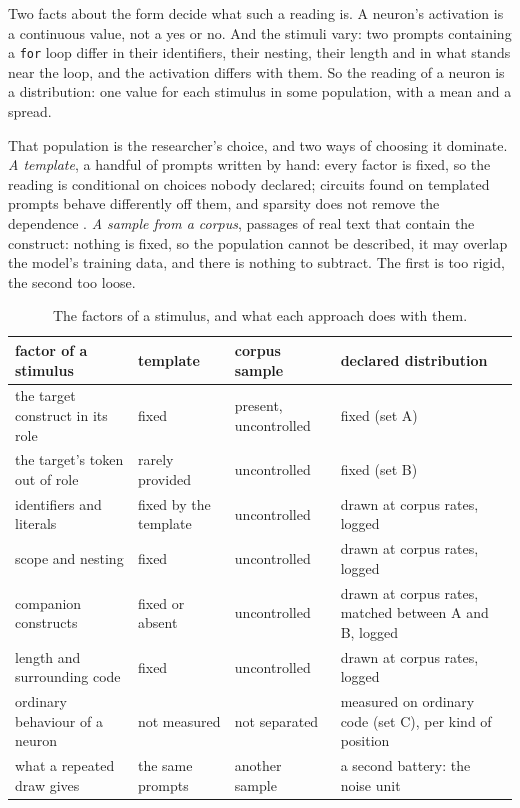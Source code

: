 \documentclass{article}
\begin{document}
Two facts about the form decide what such a reading is. A neuron's activation is a continuous value, not a yes or no. And the stimuli vary: two prompts containing a \texttt{for} loop differ in their identifiers, their nesting, their length and in what stands near the loop, and the activation differs with them. So the reading of a neuron is a distribution: one value for each stimulus in some population, with a mean and a spread.

That population is the researcher's choice, and two ways of choosing it dominate. \emph{A template}, a handful of prompts written by hand: every factor is fixed, so the reading is conditional on choices nobody declared; circuits found on templated prompts behave differently off them, and sparsity does not remove the dependence \citep{wu2026,tan2024}. \emph{A sample from a corpus}, passages of real text that contain the construct: nothing is fixed, so the population cannot be described, it may overlap the model's training data, and there is nothing to subtract. The first is too rigid, the second too loose.

\begin{table}[t]
\centering
\scriptsize
\renewcommand{\arraystretch}{1.25}
\setcounter{table}{0}
\caption{The factors of a stimulus, and what each approach does with them.}
\label{tab:1}
\vspace{3pt}
\begin{tabular}{@{}>{\raggedright\arraybackslash}p{0.2500\dimexpr\textwidth-6\tabcolsep\relax}>{\raggedright\arraybackslash}p{0.2500\dimexpr\textwidth-6\tabcolsep\relax}>{\raggedright\arraybackslash}p{0.2500\dimexpr\textwidth-6\tabcolsep\relax}>{\raggedright\arraybackslash}p{0.2500\dimexpr\textwidth-6\tabcolsep\relax}@{}}
\toprule
factor of a stimulus & template & corpus sample & declared distribution \\
\midrule
the target construct in its role & fixed & present, uncontrolled & fixed (set A) \\\addlinespace[2.5pt]
the target's token out of role & rarely provided & uncontrolled & fixed (set B) \\\addlinespace[2.5pt]
identifiers and literals & fixed by the template & uncontrolled & drawn at corpus rates, logged \\\addlinespace[2.5pt]
scope and nesting & fixed & uncontrolled & drawn at corpus rates, logged \\\addlinespace[2.5pt]
companion constructs & fixed or absent & uncontrolled & drawn at corpus rates, matched between A and B, logged \\\addlinespace[2.5pt]
length and surrounding code & fixed & uncontrolled & drawn at corpus rates, logged \\\addlinespace[2.5pt]
ordinary behaviour of a neuron & not measured & not separated & measured on ordinary code (set C), per kind of position \\\addlinespace[2.5pt]
what a repeated draw gives & the same prompts & another sample & a second battery: the noise unit \\
\bottomrule
\end{tabular}
\end{table}
\end{document}
